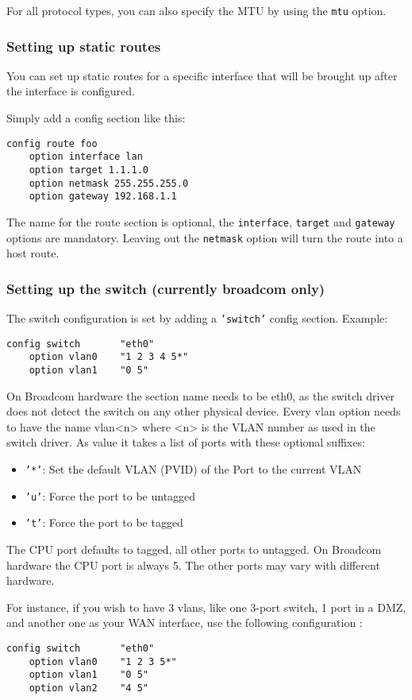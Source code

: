 For all protocol types, you can also specify the MTU by using the \texttt{mtu} option.

\subsubsection{Setting up static routes}

You can set up static routes for a specific interface that will be brought up 
after the interface is configured.

Simply add a config section like this:

\begin{Verbatim}
config route foo
	option interface lan
	option target 1.1.1.0
	option netmask 255.255.255.0
	option gateway 192.168.1.1
\end{Verbatim}

The name for the route section is optional, the \texttt{interface}, \texttt{target} and 
\texttt{gateway} options are mandatory.
Leaving out the \texttt{netmask} option will turn the route into a host route.

\subsubsection{Setting up the switch (currently broadcom only)}

The switch configuration is set by adding a \texttt{'switch'} config section.
Example:

\begin{Verbatim}
config switch       "eth0"
    option vlan0    "1 2 3 4 5*"
    option vlan1    "0 5"
\end{Verbatim}

On Broadcom hardware the section name needs to be eth0, as the switch driver
does not detect the switch on any other physical device.
Every vlan option needs to have the name vlan<n> where <n> is the VLAN number
as used in the switch driver.
As value it takes a list of ports with these optional suffixes:

\begin{itemize}
    \item{\texttt{'*'}:}
        Set the default VLAN (PVID) of the Port to the current VLAN
    \item{\texttt{'u'}:}
        Force the port to be untagged
    \item{\texttt{'t'}:}
        Force the port to be tagged
\end{itemize}

The CPU port defaults to tagged, all other ports to untagged.
On Broadcom hardware the CPU port is always 5. The other ports may vary with
different hardware.

For instance, if you wish to have 3 vlans, like one 3-port switch, 1 port in a
DMZ, and another one as your WAN interface, use the following configuration :

\begin{Verbatim}
config switch       "eth0"
    option vlan0    "1 2 3 5*"
    option vlan1    "0 5"
    option vlan2    "4 5"
\end{Verbatim}
